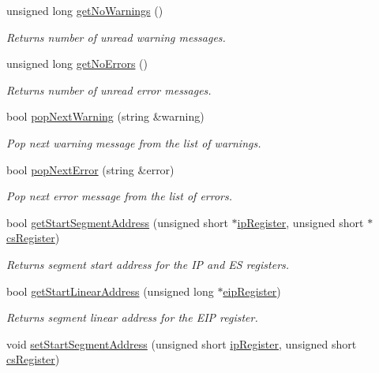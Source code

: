 \begin{DoxyCompactItemize}
unsigned long \hyperlink{classintelhex_a05a19e1e9f1eb493a8d0bc29db88683f}{get\-No\-Warnings} ()
\begin{DoxyCompactList}\small\item\em Returns number of unread warning messages. \end{DoxyCompactList}\item 
unsigned long \hyperlink{classintelhex_a77cddd46c3f97692b4d89f138bdabb72}{get\-No\-Errors} ()
\begin{DoxyCompactList}\small\item\em Returns number of unread error messages. \end{DoxyCompactList}\item 
bool \hyperlink{classintelhex_ab881b8cb0fe665395a29e4375db8f7c4}{pop\-Next\-Warning} (string \&warning)
\begin{DoxyCompactList}\small\item\em Pop next warning message from the list of warnings. \end{DoxyCompactList}\item 
bool \hyperlink{classintelhex_a6609fd1c57a650c45a1961f6318d643e}{pop\-Next\-Error} (string \&error)
\begin{DoxyCompactList}\small\item\em Pop next error message from the list of errors. \end{DoxyCompactList}\item 
bool \hyperlink{classintelhex_a94d6d17ba22263a4775d80b2a0e6e95f}{get\-Start\-Segment\-Address} (unsigned short $\ast$\hyperlink{classintelhex_acf63100ba6ba58da893f29596560efbd}{ip\-Register}, unsigned short $\ast$\hyperlink{classintelhex_aabbf5689bc667734dca7f23a11d3df68}{cs\-Register})
\begin{DoxyCompactList}\small\item\em Returns segment start address for the I\-P and E\-S registers. \end{DoxyCompactList}\item 
bool \hyperlink{classintelhex_a7bc61f72756d37509e768906733ba10b}{get\-Start\-Linear\-Address} (unsigned long $\ast$\hyperlink{classintelhex_abedd6ca388d3cad1d2525abc5939d27e}{eip\-Register})
\begin{DoxyCompactList}\small\item\em Returns segment linear address for the E\-I\-P register. \end{DoxyCompactList}\item 
void \hyperlink{classintelhex_a9688f0002be870b05d64b5f9fcdeb86b}{set\-Start\-Segment\-Address} (unsigned short \hyperlink{classintelhex_acf63100ba6ba58da893f29596560efbd}{ip\-Register}, unsigned short \hyperlink{classintelhex_aabbf5689bc667734dca7f23a11d3df68}{cs\-Register})

\end{DoxyCompactItemize}
